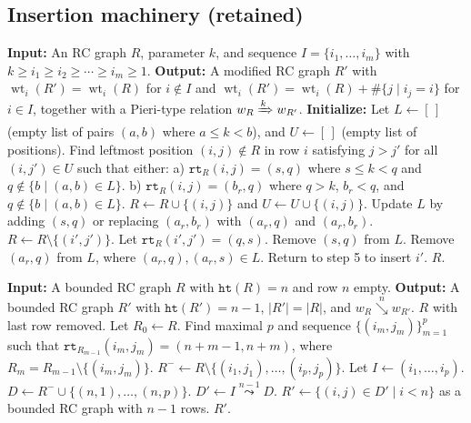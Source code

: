 \documentclass{amsart}
\theoremstyle{definition}
\theoremstyle{remark}
\newcommand{\wtt}{\operatorname{wt}}
\newcommand{\wof}[1]{w_{#1}}
\newcommand{\hr}{\mathtt{ht}}
\newcommand{\Tom}[1]{\xRightarrow{#1}}
\newcommand{\downvar}[1]{\stackrel{#1}{\searrow}}
\newcommand{\rtt}{\mathtt{rt}}
\newcommand{\zeromap}{\mathcal{Z}}
\newcommand{\xleadsto}[2][]{\overset{#2}{\leadsto}}
\newcommand{\ins}[2]{{#2\xleadsto{#1}}}
\begin{document}
\subsection{Insertion machinery (retained)}

\begin{algorithm}
\caption{Pseudo-Pieri insertion $\ins{k}{I} R$}
\label{algorithm:insertion}
\begin{algorithmic}[1]
\State \textbf{Input:} An RC graph $R$, parameter $k$, and sequence $I = \{i_1, \ldots, i_m\}$ with $k\geq i_1 \geq i_2 \geq \cdots \geq i_m \geq 1$.
\State \textbf{Output:} A modified RC graph $R'$ with $\wtt_i(R')=\wtt_i(R)$ for $i\notin I$ and $\wtt_i(R')=\wtt_i(R)+\#\{j \mid i_j = i\}$ for $i\in I$, together with a Pieri-type relation $\wof{R}\Tom{k} \wof{R'}$.
\State \textbf{Initialize:} Let $L \gets [\,]$ (empty list of pairs $(a,b)$ where $a\leq k < b$), and $U\gets [\,]$ (empty list of positions).
\State Find leftmost position $(i,j) \notin R$ in row $i$ satisfying $j>j'$ for all $(i,j')\in U$ such that either:
\State \quad a) $\rtt_R(i,j) = (s,q)$ where $s \leq k < q$ and $q \notin \{b \mid (a,b) \in L\}$.
\State \quad b) $\rtt_R(i,j) = (b_r,q)$ where $q > k$, $b_r<q$, and $q \notin \{b \mid (a,b) \in L\}$.
\State $R \gets R \cup \{(i,j)\}$ and $U\gets U \cup \{(i,j)\}$.
\State Update $L$ by adding $(s,q)$ or replacing $(a_r,b_r)$ with $(a_r,q)$ and $(a_r,b_r)$.
\If{there exists $(i',j') \in R$ with $\rtt_R(i',j') \in \Phi^-$}
\State $R \gets R \setminus \{(i',j')\}$.
\State Let $\rtt_R(i',j') = (q,s)$.
\State Remove $(s,q)$ from $L$.
\Else
\State Remove $(a_r,q)$ from $L$, where $(a_r,q),(a_r,s)\in L$.
\EndIf
\State Return to step 5 to insert $i'$.
\EndIf
\EndFor
\State \Return $R$.
\end{algorithmic}
\end{algorithm}

\begin{algorithm}
\caption{Map $\zeromap(R)$ zeroing out last row}
\label{algorithm:zero}
\begin{algorithmic}[1]
\State \textbf{Input:} A bounded RC graph $R$ with $\hr(R)=n$ and row $n$ empty.
\State \textbf{Output:} A bounded RC graph $R'$ with $\hr(R')=n-1$, $|R'|=|R|$, and $\wof{R}\downvar{n}\wof{R'}$.
\State \Return $R$ with last row removed.
\Else
\State Let $R_0\gets R$.
\State Find maximal $p$ and sequence $\{(i_m,j_m)\}_{m=1}^p$ such that
\State \quad $\rtt_{R_{m-1}}(i_m,j_m)=(n+m-1,n+m)$, where $R_m=R_{m-1}\setminus\{(i_m,j_m)\}$.
\State $R^-\gets R\setminus\{(i_1,j_1),\ldots,(i_p,j_p)\}$.
\State Let $I\gets(i_1,\ldots,i_p)$.
\State $D\gets R^-\cup\{(n,1),\ldots,(n,p)\}$.
\State $D'\gets \ins{n-1}{I}D$.
\State $R'\gets\{(i,j)\in D'\mid i<n\}$ as a bounded RC graph with $n-1$ rows.
\State \Return $R'$.
\EndIf
\end{algorithmic}
\end{algorithm}
\end{document}

